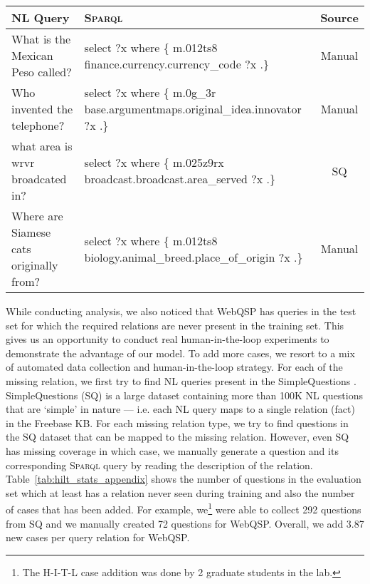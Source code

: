 \documentclass[11pt]{article}
\newcommand{\spql}{\textsc{Sparql}\xspace}
\begin{document}
\begin{table*}
    \centering
    \small
    \setlength{\tabcolsep}{3pt}
    \begin{tabular}{@{}l l c@{}}\toprule
        NL Query & \spql & Source\\\midrule
        What is the Mexican Peso called? & select ?x where \{ m.012ts8 finance.currency.currency\_code ?x .\} & Manual\\
        Who invented the telephone? & select ?x where \{ m.0g\_3r  base.argumentmaps.original\_idea.innovator ?x  .\} & Manual \\
        what area is wrvr broadcated in? & select ?x where \{ m.025z9rx broadcast.broadcast.area\_served ?x .\} & SQ\\
        Where are Siamese cats originally from? & select ?x where \{ m.012ts8 biology.animal\_breed.place\_of\_origin ?x .\} & Manual\\ \bottomrule   
\end{tabular}
    \caption{Examples of few added questions and their corresponding \spql queries. Notice that the \spql queries are very simple to create once we know the name of the missing relation. The source column indicate whether the question was manually created or automatically added from Simple Questions (SQ) dataset.}
    \label{tab:hitl_appendix}
\end{table*}


While conducting analysis, we also noticed that WebQSP has queries in the test set for which the required relations are never present in the training set. This gives us an opportunity to conduct real human-in-the-loop experiments to demonstrate the advantage of our model. To add more cases, we resort to a mix of automated data collection and human-in-the-loop strategy. For each of the missing relation, we first try to find NL queries present in the SimpleQuestions \cite{bordes2015large}. SimpleQuestions (SQ) is a large dataset containing more than 100K NL questions that are `simple' in nature --- i.e. each NL query maps to a single relation (fact) in the Freebase KB.  For each missing relation type, we try to find questions in the SQ dataset that can be mapped to the missing relation. However, even SQ has missing coverage in which case, we manually generate a question and its corresponding \spql query by reading the description of the relation. Table~\ref{tab:hilt_stats_appendix} shows the number of questions in the evaluation set which at least has a relation never seen during training and also the number of cases that has been added. For example, we\footnote{The H-I-T-L case addition was done by 2 graduate students in the lab. } were able to collect 292 questions from SQ and we manually created 72 questions for WebQSP. Overall, we add 3.87 new cases per query relation for WebQSP.
\end{document}
